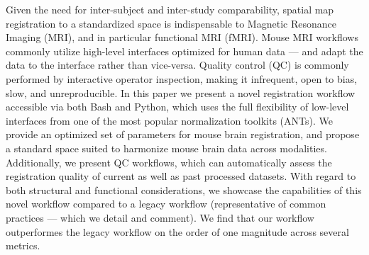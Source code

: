 Given the need for inter-subject and inter-study comparability, spatial map registration to a standardized space is indispensable to Magnetic Resonance Imaging (MRI), and in particular functional MRI (fMRI).
Mouse MRI workflows commonly utilize high-level interfaces optimized for human data --- and adapt the data to the interface rather than vice-versa.
Quality control (QC) is commonly performed by interactive operator inspection, making it infrequent, open to bias, slow, and unreproducible.
In this paper we present a novel registration workflow accessible via both Bash and Python, which uses the full flexibility of low-level interfaces from one of the most popular normalization toolkits (ANTs).
We provide an optimized set of parameters for mouse brain registration, and propose a standard space suited to harmonize mouse brain data across modalities.
Additionally, we present QC workflows, which can automatically assess the registration quality of current as well as past processed datasets.
With regard to both structural and functional considerations, we showcase the capabilities of this novel workflow compared to a legacy workflow (representative of common practices --- which we detail and comment).
We find that our workflow outperformes the legacy workflow on the order of one magnitude across several metrics.

